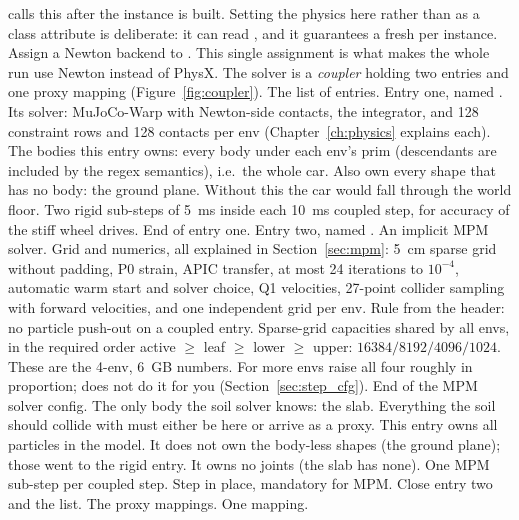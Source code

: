 \begin{explain}
  calls this after the instance is built. Setting
  the physics here rather than as a class attribute is deliberate: it can
  read , and it guarantees a fresh
   per instance.
 Assign a Newton backend to . This single
  assignment is what makes the whole run use Newton instead of PhysX.
 The solver is a \emph{coupler} holding two entries and one proxy
  mapping (Figure~\ref{fig:coupler}).
 The list of entries.
 Entry one, named .
 Its solver: MuJoCo-Warp with Newton-side contacts, the
   integrator, and 128 constraint rows and 128 contacts
  per env (Chapter~\ref{ch:physics} explains each).
 The bodies this entry owns: every body under each env's
   prim (descendants are included by the regex semantics),
  i.e.\ the whole car.
 Also own every shape that has no body: the ground plane. Without
  this the car would fall through the world floor.
 Two rigid sub-steps of 5~ms inside each 10~ms coupled step, for
  accuracy of the stiff wheel drives.
 End of entry one.
 Entry two, named .
 An implicit MPM solver.
 Grid and numerics, all explained in
  Section~\ref{sec:mpm}: 5~cm sparse grid without padding, P0 strain, APIC
  transfer, at most 24 iterations to $10^{-4}$, automatic warm start and
  solver choice, Q1 velocities, 27-point collider sampling with forward
  velocities, and one independent grid per env.
 Rule from the header: no particle push-out on a coupled
  entry.
 Sparse-grid capacities shared by all envs, in the required
  order active $\geq$ leaf $\geq$ lower $\geq$ upper:
  $16384 / 8192 / 4096 / 1024$. These are the 4-env, 6~GB numbers. For more
  envs raise all four roughly in proportion;  does not do it
  for you (Section~\ref{sec:step_cfg}).
 End of the MPM solver config.
 The only body the soil solver knows: the slab. Everything the soil
  should collide with must either be here or arrive as a proxy.
 This entry owns all particles in the model.
 It does not own the body-less shapes (the ground plane); those went
  to the rigid entry.
 It owns no joints (the slab has none).
 One MPM sub-step per coupled step.
 Step in place, mandatory for MPM.
 Close entry two and the list.
 The proxy mappings.
 One mapping.

\end{explain}
